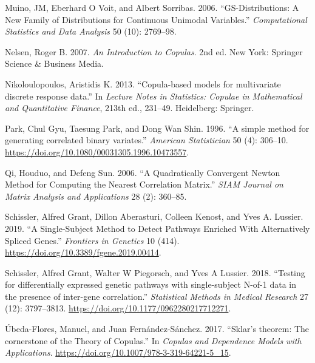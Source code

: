 \documentclass{article}
\newlength{\cslhangindent}
\newenvironment{CSLReferences}[2] %
 {%
  \setlength{\parindent}{0pt}
  \ifodd #1 \everypar{\setlength{\hangindent}{\cslhangindent}}\ignorespaces\fi
  \ifnum #2 > 0
  \setlength{\parskip}{#2\baselineskip}
  \fi
 }%
 {}
\begin{document}
\begin{CSLReferences}{1}{0}
\leavevmode{}%
Muino, JM, Eberhard O Voit, and Albert Sorribas. 2006.
{``GS-Distributions: A New Family of Distributions for Continuous
Unimodal Variables.''} \emph{Computational Statistics and Data Analysis}
50 (10): 2769--98.

\leavevmode{}%
Nelsen, Roger B. 2007. \emph{{An Introduction to Copulas}}. 2nd ed. New
York: Springer Science {\&} Business Media.

\leavevmode{}%
Nikoloulopoulos, Aristidis K. 2013. {``{Copula-based models for
multivariate discrete response data}.''} In \emph{Lecture Notes in
Statistics: Copulae in Mathematical and Quantitative Finance}, 213th
ed., 231--49. Heidelberg: Springer.

\leavevmode{}%
Park, Chul Gyu, Taesung Park, and Dong Wan Shin. 1996. {``{A simple
method for generating correlated binary variates}.''} \emph{American
Statistician} 50 (4): 306--10.
\url{https://doi.org/10.1080/00031305.1996.10473557}.

\leavevmode{}%
Qi, Houduo, and Defeng Sun. 2006. {``A Quadratically Convergent Newton
Method for Computing the Nearest Correlation Matrix.''} \emph{SIAM
Journal on Matrix Analysis and Applications} 28 (2): 360--85.

\leavevmode{}%
Schissler, Alfred Grant, Dillon Aberasturi, Colleen Kenost, and Yves A.
Lussier. 2019. {``{A Single-Subject Method to Detect Pathways Enriched
With Alternatively Spliced Genes}.''} \emph{Frontiers in Genetics} 10
(414). \url{https://doi.org/10.3389/fgene.2019.00414}.

\leavevmode{}%
Schissler, Alfred Grant, Walter W Piegorsch, and Yves A Lussier. 2018.
{``{Testing for differentially expressed genetic pathways with
single-subject N-of-1 data in the presence of inter-gene
correlation}.''} \emph{Statistical Methods in Medical Research} 27 (12):
3797--3813. \url{https://doi.org/10.1177/0962280217712271}.

\leavevmode{}%
Úbeda-Flores, Manuel, and Juan Fernández-Sánchez. 2017. {``{Sklar's
theorem: The cornerstone of the Theory of Copulas}.''} In \emph{Copulas
and Dependence Models with Applications}.
\url{https://doi.org/10.1007/978-3-319-64221-5_15}.


\end{CSLReferences}
\end{document}
